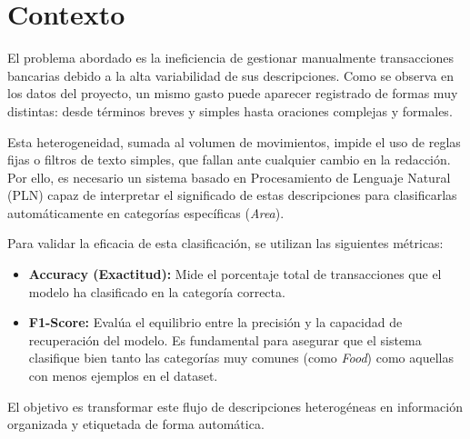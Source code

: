 \section{Contexto}
\label{sec:contexto}

El problema abordado es la ineficiencia de gestionar manualmente transacciones bancarias debido a la alta variabilidad de sus descripciones. Como se observa en los datos del proyecto, un mismo gasto puede aparecer registrado de formas muy distintas: desde términos breves y simples hasta oraciones complejas y formales.

Esta heterogeneidad, sumada al volumen de movimientos, impide el uso de reglas fijas o filtros de texto simples, que fallan ante cualquier cambio en la redacción. Por ello, es necesario un sistema basado en Procesamiento de Lenguaje Natural (PLN) capaz de interpretar el significado de estas descripciones para clasificarlas automáticamente en categorías específicas (\textit{Area}). 

Para validar la eficacia de esta clasificación, se utilizan las siguientes métricas:

\begin{itemize}
    \item \textbf{Accuracy (Exactitud):} Mide el porcentaje total de transacciones que el modelo ha clasificado en la categoría correcta.
    \item \textbf{F1-Score:} Evalúa el equilibrio entre la precisión y la capacidad de recuperación del modelo. Es fundamental para asegurar que el sistema clasifique bien tanto las categorías muy comunes (como \textit{Food}) como aquellas con menos ejemplos en el dataset.
\end{itemize}

El objetivo es transformar este flujo de descripciones heterogéneas en información organizada y etiquetada de forma automática.